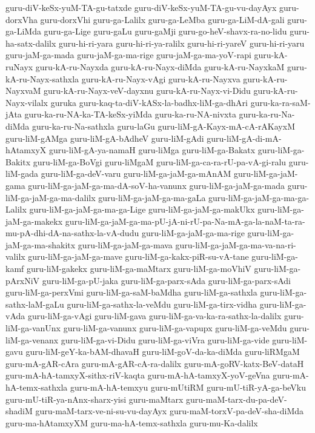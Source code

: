 {guru-diV-keSx-yuM-TA-gu-tatxde
guru-diV-keSx-yuM-TA-gu-vu-dayAyx
guru-dorxVha
guru-dorxVhi
guru-ga-Lalilx
guru-ga-LeMba
guru-ga-LiM-dA-gali
guru-ga-LiMda
guru-ga-Lige
guru-gaLu
guru-gaMji
guru-go-heV-shavx-ra-no-lidu
guru-ha-satx-dalilx
guru-hi-ri-yara
guru-hi-ri-ya-ralilx
guru-hi-ri-yareV
guru-hi-ri-yaru
guru-jaM-ga-mada
guru-jaM-ga-ma-rige
guru-jaM-ga-ma-yoV-rapi
guru-kA-ruNayx
guru-kA-ru-Nayxda
guru-kA-ru-Nayx-diMda
guru-kA-ru-NayxkaM
guru-kA-ru-Nayx-sathxla
guru-kA-ru-Nayx-vAgi
guru-kA-ru-Nayxva
guru-kA-ru-NayxvaM
guru-kA-ru-Nayx-veV-dayxnu
guru-kA-ru-Nayx-vi-Didu
guru-kA-ru-Nayx-vilalx
guruka
guru-kaq-ta-diV-kASx-la-badhx-liM-ga-dhAri
guru-ka-ra-saM-jAta
guru-ka-ru-NA-ka-TA-keSx-yiMda
guru-ka-ru-NA-nivxta
guru-ka-ru-Na-diMda
guru-ka-ru-Na-sathxla
guru-laGu
guru-liM-gA-Kayx-mA-cA-rAKayxM
guru-liM-gAMga
guru-liM-gA-bAdheV
guru-liM-gAdi
guru-liM-gA-di-mA-hAtamxyX
guru-liM-gA-ya-namaH
guru-liMga
guru-liM-ga-Bakatx
guru-liM-ga-Bakitx
guru-liM-ga-BoVgi
guru-liMgaM
guru-liM-ga-ca-ra-rU-pa-vA-gi-ralu
guru-liM-gada
guru-liM-ga-deV-varu
guru-liM-ga-jaM-ga-mAnAM
guru-liM-ga-jaM-gama
guru-liM-ga-jaM-ga-ma-dA-soV-ha-vanunx
guru-liM-ga-jaM-ga-mada
guru-liM-ga-jaM-ga-ma-dalilx
guru-liM-ga-jaM-ga-ma-gaLa
guru-liM-ga-jaM-ga-ma-ga-Lalilx
guru-liM-ga-jaM-ga-ma-ga-Lige
guru-liM-ga-jaM-ga-makUkx
guru-liM-ga-jaM-ga-makekx
guru-liM-ga-jaM-ga-ma-pU-jA-ni-rU-pa-Na-mA-ga-la-naM-ta-ra-mu-pA-dhi-dA-na-sathx-la-vA-dudu
guru-liM-ga-jaM-ga-ma-rige
guru-liM-ga-jaM-ga-ma-shakitx
guru-liM-ga-jaM-ga-mava
guru-liM-ga-jaM-ga-ma-va-na-ri-valilx
guru-liM-ga-jaM-ga-mave
guru-liM-ga-kakx-piR-su-vA-tane
guru-liM-ga-kamf
guru-liM-gakekx
guru-liM-ga-maMtarx
guru-liM-ga-moVhiV
guru-liM-ga-pArxNiV
guru-liM-ga-pU-jaka
guru-liM-ga-parx-sAda
guru-liM-ga-parx-sAdi
guru-liM-ga-perxVmi
guru-liM-ga-saM-baMdha
guru-liM-ga-sathxla
guru-liM-ga-sathx-laM-gaLu
guru-liM-ga-sathx-la-veMdu
guru-liM-ga-tirx-vidha
guru-liM-ga-vAda
guru-liM-ga-vAgi
guru-liM-gava
guru-liM-ga-va-ka-ra-sathx-la-dalilx
guru-liM-ga-vanUnx
guru-liM-ga-vanunx
guru-liM-ga-vapupx
guru-liM-ga-veMdu
guru-liM-ga-venanx
guru-liM-ga-vi-Didu
guru-liM-ga-viVra
guru-liM-ga-vide
guru-liM-gavu
guru-liM-geY-ka-bAM-dhavaH
guru-liM-goV-da-ka-diMda
guru-liRMgaM
guru-mA-gAR-cAra
guru-mA-gAR-cA-ra-dalilx
guru-mA-goRV-katx-BeV-dataH
guru-mA-hA-tamxyX-sithx-riV-kaqta
guru-mA-hA-tamxyX-yoV-geVna
guru-mA-hA-temx-sathxla
guru-mA-hA-temxyu
guru-mUtiRM
guru-mU-tiR-yA-ga-beVku
guru-mU-tiR-ya-nAnx-sharx-yisi
guru-maMtarx
guru-maM-tarx-du-pa-deV-shadiM
guru-maM-tarx-ve-ni-su-vu-dayAyx
guru-maM-torxV-pa-deV-sha-diMda
guru-ma-hAtamxyXM
guru-ma-hA-temx-sathxla
guru-mu-Ka-dalilx
}
